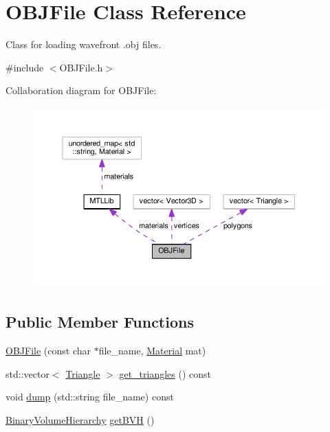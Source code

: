 \hypertarget{classOBJFile}{}\section{O\+B\+J\+File Class Reference}
\label{classOBJFile}


Class for loading wavefront .obj files.  




{\ttfamily \#include $<$O\+B\+J\+File.\+h$>$}



Collaboration diagram for O\+B\+J\+File\+:\nopagebreak
\begin{figure}[H]
\begin{center}
\leavevmode
\includegraphics[width=350pt]{classOBJFile__coll__graph}
\end{center}
\end{figure}
\subsection*{Public Member Functions}
\begin{DoxyCompactItemize}
\item 
\hyperlink{classOBJFile_ac6c14cded889593868aaab4e7d3e4bfb}{O\+B\+J\+File} (const char $\ast$file\+\_\+name, \hyperlink{classMaterial}{Material} mat)
\item 
std\+::vector$<$ \hyperlink{classTriangle}{Triangle} $>$ \hyperlink{classOBJFile_a1cb54aff5da0d8a5e06f2441a9a474c9}{get\+\_\+triangles} () const 
\item 
void \hyperlink{classOBJFile_afb445848916f5a138b262d7fcb0e136f}{dump} (std\+::string file\+\_\+name) const 
\item 
\hyperlink{classBinaryVolumeHierarchy}{Binary\+Volume\+Hierarchy} \hyperlink{classOBJFile_ae3128b473a8b7b837364cc9688cb89dc}{get\+B\+VH} ()
\end{DoxyCompactItemize}
